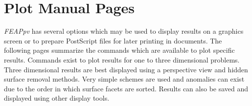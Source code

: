 \chapter[Plot Manual]{Plot Manual Pages}

{\sl FEAPpv} has several options which may be used to display results
on a graphics screen or to prepare PostScript files for later printing
in documents.  The following
pages summarize the commands which are available to plot specific results.
Commands exist to plot results for one to three dimensional problems.
Three dimensional results are best displayed using a perspective view and
hidden surface removal methods.  Very simple schemes are used and anomalies
can exist due to the order in which surface facets are sorted.  Results
can also be saved and displayed using other display tools.

\pagebreak









































